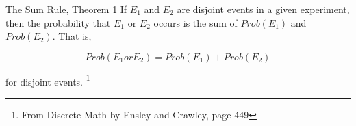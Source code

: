 \documentclass[a4paper,12pt]{book}
\newcounter{question}
\begin{document}
        \newpage
        \begin{intro}{The Sum Rule, Theorem 1}
            If $E_1$ and $E_2$ are disjoint events in a given experiment,
            then the probability that $E_1$ or $E_2$ occurs is the sum of
            $Prob(E_1)$ and $Prob(E_2)$. That is,
            
            $$Prob(E_1 or E_2) = Prob(E_1) + Prob(E_2)$$
            
            for disjoint events.            
            \footnote{From Discrete Math by Ensley and Crawley, page 449}
        \end{intro}

        
\end{document}
